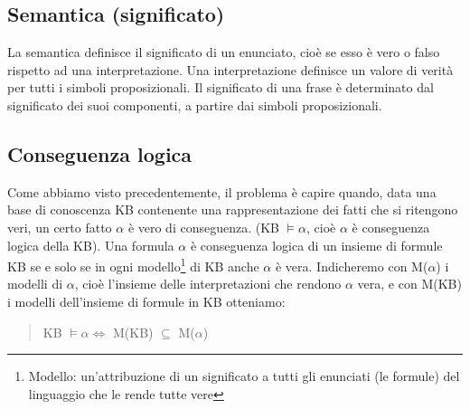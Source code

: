 \documentclass{article}
\begin{document}
\subsection{Semantica (significato)}
La semantica definisce il significato di un enunciato, cioè se esso è vero o falso rispetto ad una interpretazione. Una interpretazione definisce un valore di verità per tutti i simboli proposizionali. Il significato di una frase è determinato dal significato dei suoi componenti, a partire dai simboli proposizionali.

\subsection{Conseguenza logica}
Come abbiamo visto precedentemente, il problema è capire quando, data una base di conoscenza KB contenente una rappresentazione dei fatti che si ritengono veri, un certo fatto $\alpha$ è vero di conseguenza. (KB $\models \alpha$, cioè $\alpha$ è conseguenza logica della KB). \newline
Una formula $\alpha$ è conseguenza logica di un insieme di formule KB se e solo se in ogni modello\footnote{Modello: un'attribuzione di un significato a tutti gli enunciati (le formule) del linguaggio che le rende tutte vere} di KB anche $\alpha$ è vera. \newline
Indicheremo con M($\alpha$) i modelli di $\alpha$, cioè l’insieme delle interpretazioni che rendono $\alpha$ vera, e con M(KB) i modelli dell'insieme di formule in KB otteniamo:
\begin{quote}
    KB $\models \alpha \Leftrightarrow$ M(KB) $\subseteq$ M($\alpha$)
\end{quote}
\end{document}
